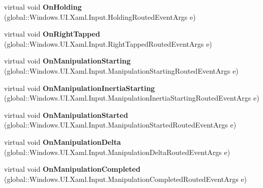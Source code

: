 \begin{DoxyCompactItemize}
virtual void {\bfseries On\+Holding} (global\+::\+Windows.\+U\+I.\+Xaml.\+Input.\+Holding\+Routed\+Event\+Args e)
\item 
\mbox{\label{class_windows_1_1_u_i_1_1_xaml_1_1_controls_1_1_control_addc7255a46f490ec04cc165962614c99}} 
virtual void {\bfseries On\+Right\+Tapped} (global\+::\+Windows.\+U\+I.\+Xaml.\+Input.\+Right\+Tapped\+Routed\+Event\+Args e)
\item 
\mbox{\label{class_windows_1_1_u_i_1_1_xaml_1_1_controls_1_1_control_a967a18b3578c9d2bd19a72f4a964d3a3}} 
virtual void {\bfseries On\+Manipulation\+Starting} (global\+::\+Windows.\+U\+I.\+Xaml.\+Input.\+Manipulation\+Starting\+Routed\+Event\+Args e)
\item 
\mbox{\label{class_windows_1_1_u_i_1_1_xaml_1_1_controls_1_1_control_a435a48ffc2e72a28d5a8c492fb75ee38}} 
virtual void {\bfseries On\+Manipulation\+Inertia\+Starting} (global\+::\+Windows.\+U\+I.\+Xaml.\+Input.\+Manipulation\+Inertia\+Starting\+Routed\+Event\+Args e)
\item 
\mbox{\label{class_windows_1_1_u_i_1_1_xaml_1_1_controls_1_1_control_aed97aaca4691b6260b928885e95b59a3}} 
virtual void {\bfseries On\+Manipulation\+Started} (global\+::\+Windows.\+U\+I.\+Xaml.\+Input.\+Manipulation\+Started\+Routed\+Event\+Args e)
\item 
\mbox{\label{class_windows_1_1_u_i_1_1_xaml_1_1_controls_1_1_control_ac8964a26bad230883f276d2a27377698}} 
virtual void {\bfseries On\+Manipulation\+Delta} (global\+::\+Windows.\+U\+I.\+Xaml.\+Input.\+Manipulation\+Delta\+Routed\+Event\+Args e)
\item 
\mbox{\label{class_windows_1_1_u_i_1_1_xaml_1_1_controls_1_1_control_a3304447f6f0bbb3c475cf58171d08f90}} 
virtual void {\bfseries On\+Manipulation\+Completed} (global\+::\+Windows.\+U\+I.\+Xaml.\+Input.\+Manipulation\+Completed\+Routed\+Event\+Args e)
\item 
\mbox{\label{class_windows_1_1_u_i_1_1_xaml_1_1_controls_1_1_control_a1b0d2df4f065db71ccbe2b00e5c5035f}} 

\end{DoxyCompactItemize}
